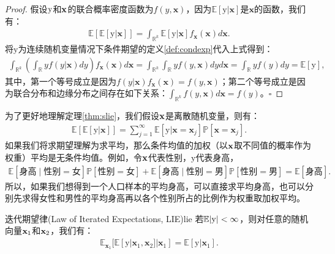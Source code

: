 \documentclass[cn,11pt,chinese]{elegantbook}
\begin{document}
\begin{proof}
	假设$\rm{y}$和$\bold{x}$的联合概率密度函数为$f(y,\boldsymbol{x})$，因为$\mathbb{E}[\mathrm{y}|\mathbf{x}]$是$\mathbf{x}$的函数，我们有：
	\begin{eqnarray*}
		\mathbb{E}[\mathbb{E}[\mathrm{y} | \mathbf{x}]]=\int_{\mathbb{R}^{k}} \mathbb{E}[\mathrm{y} | \boldsymbol{x}] f_{\mathbf{x}}(\boldsymbol{x}) d \boldsymbol{x}.
	\end{eqnarray*}
	将$\mathrm{y}$为连续随机变量情况下条件期望的定义\ref{def:condexp}代入上式得到：
	\begin{eqnarray*}
		\int_{\mathbb{R}^{k}}\left(\int_{\mathbb{R}} y f(y|\boldsymbol{x}) d y\right) f_{\mathbf{x}}(\boldsymbol{x})  d \boldsymbol{x}=\int_{\mathbb{R}^{k}} \int_{\mathbb{R}} y f(y, \boldsymbol{x}) d y d \boldsymbol{x}=\int_{\mathbb{R}}yf(y)dy=\mathbb{E}[\mathrm{y}],
	\end{eqnarray*}
	其中，第一个等号成立是因为$f(y|\boldsymbol{x}) f_{\mathbf{x}}(\boldsymbol{x})=f(y, \boldsymbol{x})$；第二个等号成立是因为联合分布和边缘分布之间存在如下关系：$\int_{\mathbb{R}^{k}}f(y,\boldsymbol{x})d\boldsymbol{x}=f(y)$。\hfill$\square$
\end{proof}
为了更好地理解定理\ref{thm:slie}，我们假设$\bold{x}$是离散随机变量，则有：
\begin{eqnarray*}
	\mathbb{E}[\mathbb{E}[\mathrm{y} | \mathbf{x}]]=\sum_{j=1}^{\infty} \mathbb{E}\left[\mathrm{y}| \mathbf{x}=\boldsymbol{x}_{j}\right] \mathbb{P}\left[\mathbf{x}=\boldsymbol{x}_{j}\right].
\end{eqnarray*}
如果我们将求期望理解为求平均，那么条件均值的加权（以$\bold{x}$取不同值的概率作为权重）平均是无条件均值。例如，令$\bold{x}$代表性别，$\mathrm{y}$代表身高，
\begin{eqnarray*}
	\mathbb{E}[\mbox{身高}\mid \mbox{性别}=\mbox{女}]\mathbb{P}\left[\mbox{性别}=\mbox{女}\right]+\mathbb{E}[\mbox{身高}\mid \mbox{性别}=\mbox{男}]\mathbb{P}\left[\mbox{性别}=\mbox{男}\right]=\mathbb{E}[\mbox{身高}].
\end{eqnarray*}
所以，如果我们想得到一个人口样本的平均身高，可以直接求平均身高，也可以分别先求得女性和男性的平均身高再以各个性别所占的比例作为权重取加权平均。
\begin{theorem}{迭代期望律(Law of Iterated Expectations, LIE)}{lie}
	若$\mathbb{E}|\rm{y}|<\infty$，则对任意的随机向量$\bold{x}_{1}$和$\bold{x}_{2}$，我们有：
	\begin{eqnarray*}
		\mathbb{E}_{\mathbf{x}_{1}}[\mathbb{E}[\mathrm{y}|\mathbf{x}_{1},\mathbf{x}_{2}]|\mathbf{x}_{1}]=\mathbb{E}[\mathrm{y}|\mathbf{x}_{1}].
	\end{eqnarray*}
\end{theorem}
\end{document}

